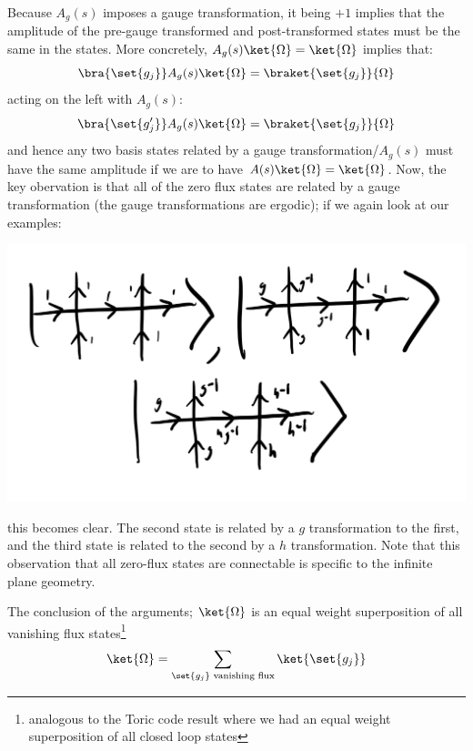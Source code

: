 Because $A_g(s)$ imposes a gauge transformation, it being $+1$ implies that the amplitude of the pre-gauge transformed and post-transformed states must be the same in the states. More concretely, $A_g(s)\ket{\Omega} = \ket{\Omega}$ implies that:
\begin{equation}
    \bra{\set{g_j}}A_g(s)\ket{\Omega} = \braket{\set{g_j}}{\Omega}
\end{equation}
acting on the left with $A_g(s)$:
\begin{equation}
    \bra{\set{g_j'}}A_g(s)\ket{\Omega} = \braket{\set{g_j}}{\Omega}
\end{equation}
and hence any two basis states related by a gauge transformation/$A_g(s)$ must have the same amplitude if we are to have $A(s)\ket{\Omega} = \ket{\Omega}$. Now, the key obervation is that all of the zero flux states are related by a gauge transformation (the gauge transformations are ergodic); if we again look at our examples:
\begin{center}
    \includegraphics[scale=0.35]{Lectures/Images/lec7-nofluxstates.png}
\end{center}
this becomes clear. The second state is related by a $g$ transformation to the first, and the third state is related to the second by a $h$ transformation. Note that this observation that all zero-flux states are connectable is specific to the infinite plane geometry.

The conclusion of the arguments; $\ket{\Omega}$ is an equal weight superposition of all vanishing flux states\footnote{analogous to the Toric code result where we had an equal weight superposition of all closed loop states}
\begin{equation}
    \ket{\Omega} = \sum_{\set{g_j} \text{ vanishing flux}} \ket{\set{g_j}}
\end{equation}

